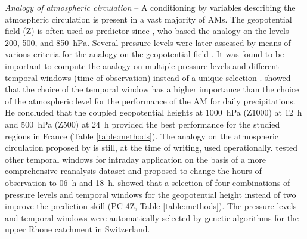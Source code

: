 \documentclass[review]{elsarticle}
\begin{document}
\textit{Analogy of atmospheric circulation} -- A conditioning by variables describing the atmospheric circulation is present in a vast majority of AMs. The geopotential field (Z) is often used as predictor since \citet{Lorenz1969}, who based the analogy on the levels 200, 500, and 850~hPa. Several pressure levels were later assessed by means of various criteria for the analogy on the geopotential field \citep{Duband1970, Duband1974, Duband1981, Guilbaud1997}. It was found to be important to compute the analogy on multiple pressure levels and different temporal windows (time of observation) instead of a unique selection \citep{Guilbaud1998, Obled2002}. \citet{Bontron2004} showed that the choice of the temporal window has a higher importance than the choice of the atmospheric level for the performance of the AM for daily precipitations. He concluded that the coupled geopotential heights at 1000~hPa (Z1000) at 12~h and 500~hPa (Z500) at 24~h provided the best performance \citep[for a subset of the NCEP/NCAR Reanalysis I;][]{Kalnay1996, Kistler2001} for the studied regions in France (Table \ref{table:methods}). The analogy on the atmospheric circulation proposed by \citet{Bontron2004} is still, at the time of writing, used operationally. \citet{Marty2010} tested other temporal windows for intraday application on the basis of a more comprehensive reanalysis dataset and proposed to change the hours of observation to 06~h and 18~h. \citet{Horton2018a} showed that a selection of four combinations of pressure levels and temporal windows for the geopotential height instead of two improve the prediction skill (PC-4Z, Table \ref{table:methods}). The pressure levels and temporal windows were automatically selected by genetic algorithms for the upper Rhone catchment in Switzerland.
\end{document}
